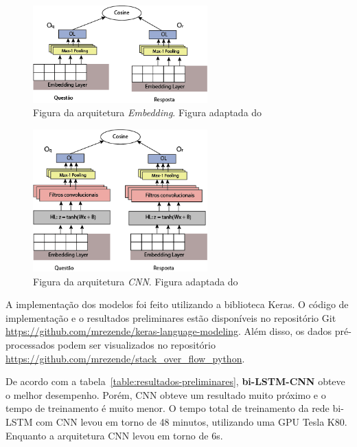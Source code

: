 \documentclass[12pt]{article}
\begin{document}
\begin{figure}[h]
    \centering
    \includegraphics[width=0.60\textwidth]{figures/ArquiteturaEmbedding.png}
    \caption{Figura da arquitetura \emph{Embedding}. Figura adaptada do \cite{tan-lstm-qa}}
    \label{fig:arquitetura-embedding}
\end{figure}

\begin{figure}[h]
    \centering
    \includegraphics[width=0.60\textwidth]{figures/ArquiteturaCNN.png}
    \caption{Figura da arquitetura \emph{CNN}. Figura adaptada do \cite{tan-lstm-qa}}
    \label{fig:arquitetura-cnn}
\end{figure}

A implementação dos modelos foi feito utilizando a biblioteca Keras. O código de implementação e o resultados preliminares estão disponíveis no repositório Git \url{https://github.com/mrezende/keras-language-modeling}. Além disso, os dados pré-processados podem ser visualizados no repositório \url{https://github.com/mrezende/stack_over_flow_python}.

De acordo com a tabela~\ref{table:resultados-preliminares}, \textbf{bi-LSTM-CNN} obteve o melhor desempenho. Porém, CNN obteve um resultado muito próximo e o tempo de treinamento é muito menor. O tempo total de treinamento da rede bi-LSTM com CNN levou em torno de 48 minutos, utilizando uma GPU Tesla K80. Enquanto a arquitetura CNN levou em torno de 6s. 
\end{document}
